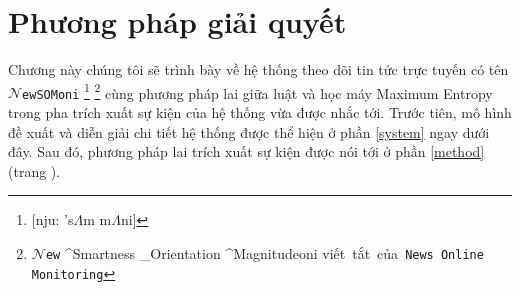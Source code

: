 
\chapter{Phương pháp giải quyết} %



\ifpdf
    \graphicspath{{3/figures/PNG/}{3/figures/PDF/}{3/figures/}}
\else
    \graphicspath{{3/figures/EPS/}{3/figures/}}
\fi



\noindent Chương này chúng tôi sẽ trình bày về hệ thống theo dõi tin tức trực tuyến có tên $\mathcal{N}$\texttt{ewSOMoni}
\footnote{[nju: 's$\Lambda$m m$\Lambda$ni]} \footnote{$\mathcal{N}$\texttt{ew} ^{\mbox{Smartness}} _{\mbox{Orientation}} ^{\mbox{Magnitude}}oni \hspace{0.2in}   \mbox{viết tắt của \texttt{News Online Monitoring}}} cùng  phương pháp lai giữa luật và học máy Maximum Entropy trong pha trích xuất sự kiện của hệ thống vừa được nhắc tới. Trước tiên, mô hình đề xuất và diễn giải chi tiết hệ thống được thể hiện ở phần \ref{system} ngay dưới đây. Sau đó, phương pháp lai trích xuất sự kiện được nói tới  ở phần \ref{method} (trang \pageref{method}).




